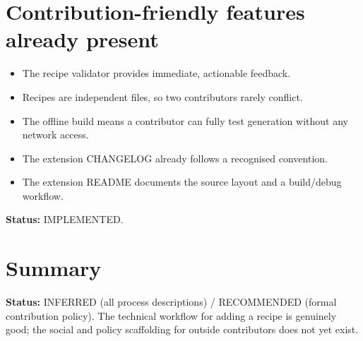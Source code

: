 \section{Contribution-friendly features already present}

\begin{itemize}
  \item The recipe validator provides immediate, actionable feedback.
  \item Recipes are independent files, so two contributors rarely conflict.
  \item The offline build means a contributor can fully test generation without
        any network access.
  \item The extension CHANGELOG already follows a recognised convention.
  \item The extension README documents the source layout and a build/debug
        workflow.
\end{itemize}

\textbf{Status:} IMPLEMENTED.

\section{Summary}

\textbf{Status:} INFERRED (all process descriptions) / RECOMMENDED (formal
contribution policy). The technical workflow for adding a recipe is genuinely
good; the social and policy scaffolding for outside contributors does not yet
exist.
